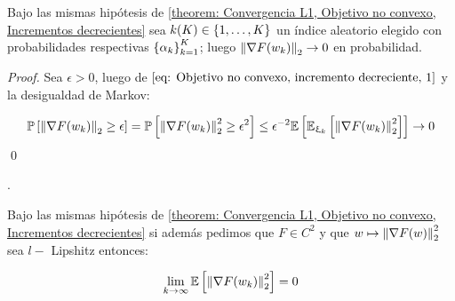 \begin{corollary}
	Bajo las mismas hip\'otesis de \ref{theorem: Convergencia L1, Objetivo no convexo, Incrementos decrecientes} sea $k(K) \in \left\lbrace1, \dots, K\right\rbrace$ un \'indice aleatorio elegido con probabilidades respectivas $\left\lbrace\alpha_k\right\rbrace_{k=1}^K$; luego $\left\lVert\nabla F(w_k)\right\rVert_2 \rightarrow 0$ en probabilidad.
\end{corollary}

\begin{proof}
	Sea $\epsilon > 0$, luego de $\ref{eq: Objetivo no convexo, incremento decreciente, 1}$ y la desigualdad de Markov:
	
	\begin{equation*}
		\mathbb{P} \left[\left\lVert\nabla F (w_k)\right\rVert_2 \geq \epsilon\right] = \mathbb{P} \left[\left\lVert\nabla F (w_k)\right\rVert_2^2 \geq \epsilon^2\right] \leq \epsilon^{-2} \mathbb{E} \left[\mathbb{E}_{\upxi_{k}} \left[\left\lVert\nabla F(w_k)\right\rVert_2^2\right]\right]  \rightarrow 0
	\end{equation*}
	 \qed
	
\end{proof}.

\begin{theorem}
	Bajo las mismas hip\'otesis de \ref{theorem: Convergencia L1, Objetivo no convexo, Incrementos decrecientes} si adem\'as pedimos que $F \in C^2$ y que $w \mapsto \left\lVert\nabla F (w)\right\rVert_2^2$ sea $l-$ Lipshitz entonces:
	
	\begin{equation}
		\lim\limits_{k \rightarrow \infty} \mathbb{E} \left[\left\lVert\nabla F (w_k)\right\rVert_2^2\right] = 0
	\end{equation}
	
\end{theorem}

